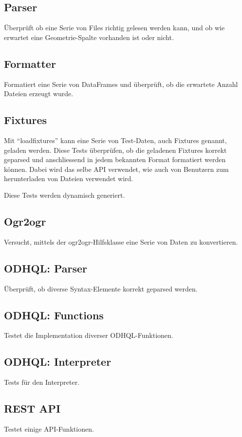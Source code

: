 \subsection{Parser}
Überprüft ob eine Serie von Files richtig gelesen werden kann, und ob wie erwartet eine Geometrie-Spalte vorhanden ist oder nicht.

\subsection{Formatter}
Formatiert eine Serie von DataFrames und überprüft, ob die erwartete Anzahl Dateien erzeugt wurde.

\subsection{Fixtures}
Mit ``loadfixtures'' kann eine Serie von Test-Daten, auch Fixtures genannt, geladen werden. Diese Tests überprüfen, ob die geladenen Fixtures korrekt geparsed und anschliessend in jedem bekannten Format formatiert werden können. Dabei wird das selbe API verwendet, wie auch von Benutzern zum herunterladen von Dateien verwendet wird.

Diese Tests werden dynamisch generiert.

\subsection{Ogr2ogr}
Versucht, mittels der ogr2ogr-Hilfsklasse eine Serie von Daten zu konvertieren.

\subsection{ODHQL: Parser}
Überprüft, ob diverse Syntax-Elemente korrekt geparsed werden.

\subsection{ODHQL: Functions}
Testet die Implementation diverser ODHQL-Funktionen.

\subsection{ODHQL: Interpreter}
Tests für den Interpreter.

\subsection{REST API}
Testet einige API-Funktionen.